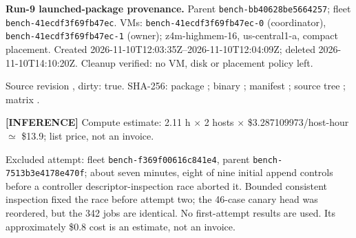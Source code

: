\small\textbf{Run-9 launched-package provenance.} Parent \texttt{bench-bb40628be5664257}; fleet \texttt{bench-41ecdf3f69fb47ec}. VMs: \texttt{bench-41ecdf3f69fb47ec-0} (coordinator), \texttt{bench-41ecdf3f69fb47ec-1} (owner); z4m-highmem-16, us-central1-a, compact placement. Created 2026-11-10T12:03:35Z--2026-11-10T12:04:09Z; deleted 2026-11-10T14:10:20Z. Cleanup verified: no VM, disk or placement policy left.

Source revision , dirty: true. SHA-256: package ; binary ; manifest ; source tree ; matrix .

\textbf{[INFERENCE]} Compute estimate: 2.11 h $\times$ 2 hosts $\times$ \$3.287109973/host-hour $\simeq$ \$13.9; list price, not an invoice.

Excluded attempt: fleet \texttt{bench-f369f00616c841e4}, parent \texttt{bench-7513b3e4178e470f}; about seven minutes, eight of nine initial append controls before a controller descriptor-inspection race aborted it. Bounded consistent inspection fixed the race before attempt two; the 46-case canary head was reordered, but the 342 jobs are identical. No first-attempt results are used. Its approximately \$0.8 cost is an estimate, not an invoice.\normalsize

